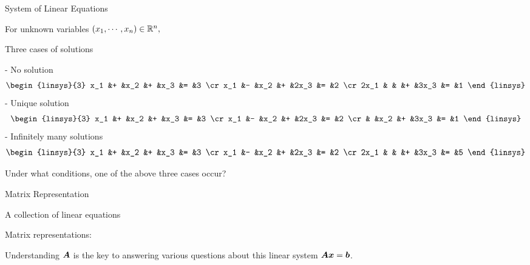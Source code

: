 \documentclass[handout,fleqn,aspectratio=169]{beamer}
\begin{document}
\begin{frame}{System of Linear Equations}

\plitemsep 0.1in


\bci 
\item For unknown variables $(x_1, \cdots, x_n) \in {\mathbb R}^{n},$

\item Three cases of solutions

{
- No solution
$$
\begin{linsys}{3}
x_1 &+ &x_2 &+ &x_3 &= &3 \cr
x_1 &- &x_2 &+ &2x_3 &= &2 \cr
2x_1 & & &+ &3x_3 &= &1 
\end{linsys}
$$
}
{
- Unique solution
$$
\begin{linsys}{3}
x_1 &+ &x_2 &+ &x_3 &= &3 \cr
x_1 &- &x_2 &+ &2x_3 &= &2 \cr
 & &x_2 &+ &3x_3 &= &1 
\end{linsys}
$$
}
{
- Infinitely many solutions 
$$
\begin{linsys}{3}
x_1 &+ &x_2 &+ &x_3 &= &3 \cr
x_1 &- &x_2 &+ &2x_3 &= &2 \cr
2x_1 & & &+ &3x_3 &= &5 
\end{linsys}
$$
}
\item \question Under what conditions, one of the above three cases occur?
\eci
\end{frame}

\begin{frame}{Matrix Representation}

\plitemsep 0.1in

\bci 
\item A collection of linear equations

\item Matrix representations: 
\item Understanding $\bm{A}$ is the key to answering various questions about this linear system $\bm{A}\bm{x} = \bm{b}$.

\eci
\end{frame}
\end{document}
